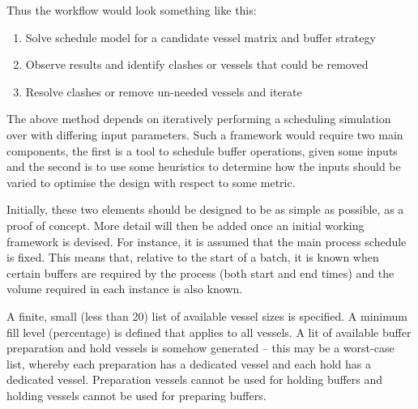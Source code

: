 Thus the workflow would look something like this:
\begin{enumerate}
\item Solve schedule model for a candidate vessel matrix and buffer strategy
\item Observe results and identify clashes or vessels that could be removed
\item Resolve clashes or remove un-needed vessels and iterate
\end{enumerate}

The above method depends on iteratively performing a scheduling simulation over
with differing input parameters.  Such a framework would require two main
components, the first is a tool to schedule buffer operations, given some inputs
and the second is to use some heuristics to determine how the inputs should be
varied to optimise the design with respect to some metric.

Initially, these two elements should be designed to be as simple as possible, as
a proof of concept.  More detail will then be added once an initial working
framework is devised.  For instance, it is assumed that the main process
schedule is fixed.  This means that, relative to the start of a batch, it is
known when certain buffers are required by the process (both start and end
times) and the volume required in each instance is also known. 

A finite, small (less than 20) list of available vessel sizes is specified.
A minimum fill level (percentage) is defined that applies to all vessels.
A lit of available buffer preparation and hold vessels is somehow generated --
this may be a worst-case list, whereby each preparation has a dedicated vessel
and each hold has a dedicated vessel.  Preparation vessels cannot be used for
holding buffers and holding vessels cannot be used for preparing buffers.


